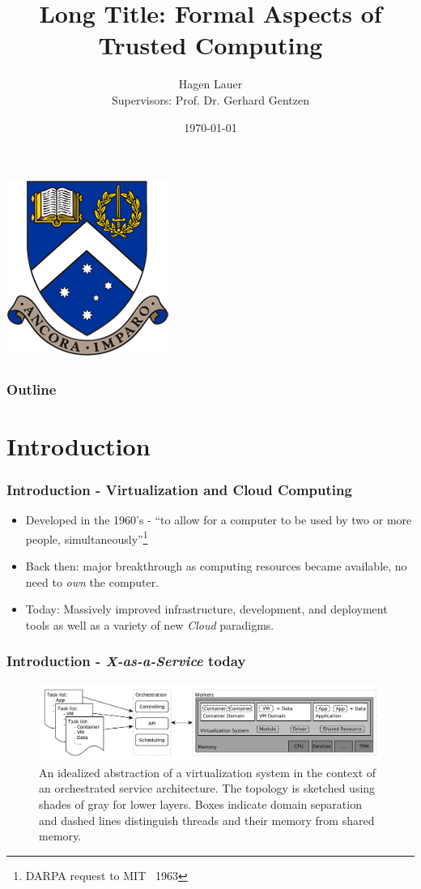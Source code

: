 \documentclass[aspectratio=169] {beamer}
\title[Short Title]{Long Title: Formal Aspects of Trusted Computing}
\author[H. Lauer]{Hagen Lauer\\ \scriptsize Supervisors: Prof. Dr. Gerhard Gentzen}
\institute[Monash]{Monash University}
\date{\today}
\begin{document}
\begin{frame}
\titlepage
\centering
\includegraphics[width=.15\textwidth]{bilder/monash}
\end{frame}

\begin{frame}
  \frametitle{Outline}
  \tableofcontents
\end{frame}

\section{Introduction}

\begin{frame}
  \frametitle{Introduction - Virtualization and Cloud Computing}

  \begin{itemize}
    \item Developed in the 1960's - ``to allow for a computer to be used by two or more people, simultaneously''\footnote{\scriptsize DARPA request to MIT ~1963}
    \item Back then: major breakthrough as computing resources became available, no need to \emph{own} the computer.
    \item Today: Massively improved infrastructure, development, and deployment tools as well as a variety of new \emph{Cloud} paradigms.
  \end{itemize}
\end{frame}

\begin{frame}\frametitle{Introduction - \emph{X-as-a-Service} today}
	\begin{figure}
		\includegraphics[scale=.4]{bilder/system-overview.pdf}
		\caption{An idealized abstraction of a virtualization system in the context of an orchestrated service architecture. The topology is sketched using shades of gray for lower layers. Boxes indicate domain separation and dashed lines distinguish threads and their memory from shared memory.}
	\end{figure}
\end{frame}
\end{document}
